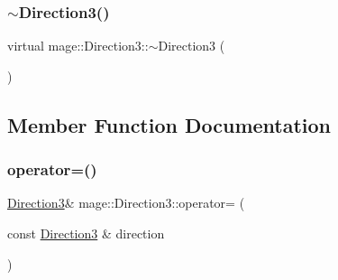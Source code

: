 \hypertarget{structmage_1_1_direction3_a4e6e67879902244cbe79be9fd5de369c}{}\label{structmage_1_1_direction3_a4e6e67879902244cbe79be9fd5de369c} 
\subsubsection{\texorpdfstring{$\sim$\+Direction3()}{~Direction3()}}
{\footnotesize\ttfamily virtual mage\+::\+Direction3\+::$\sim$\+Direction3 (\begin{DoxyParamCaption}{ }\end{DoxyParamCaption})\hspace{0.3cm}{\ttfamily [virtual]}}



\subsection{Member Function Documentation}
\hypertarget{structmage_1_1_direction3_a3b3251fcafc37b39bad2c89e5faa09bd}{}\label{structmage_1_1_direction3_a3b3251fcafc37b39bad2c89e5faa09bd} 
\subsubsection{\texorpdfstring{operator=()}{operator=()}}
{\footnotesize\ttfamily \hyperlink{structmage_1_1_direction3}{Direction3}\& mage\+::\+Direction3\+::operator= (\begin{DoxyParamCaption}\item[{const \hyperlink{structmage_1_1_direction3}{Direction3} \&}]{direction }\end{DoxyParamCaption})}

